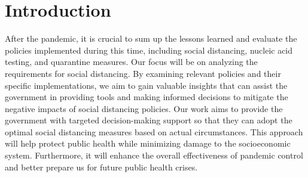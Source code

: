 \section{Introduction}




After the pandemic, it is crucial to sum up the lessons learned and evaluate the policies implemented during this time, including social distancing, nucleic acid testing, and quarantine measures. Our focus will be on analyzing the requirements for social distancing. By examining relevant policies and their specific implementations, we aim to gain valuable insights that can assist the government in providing tools and making informed decisions to mitigate the negative impacts of social distancing policies. Our work aims to provide the government with targeted decision-making support so that they can adopt the optimal social distancing measures based on actual circumstances. This approach will help protect public health while minimizing damage to the socioeconomic system. Furthermore, it will enhance the overall effectiveness of pandemic control and better prepare us for future public health crises.

